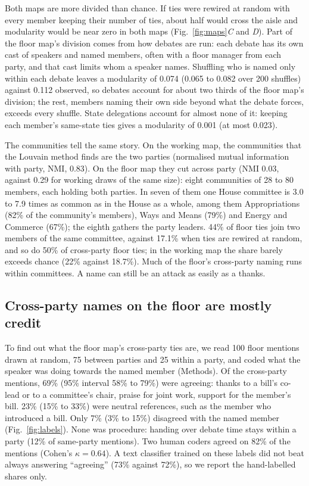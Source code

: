 \documentclass[9pt,twocolumn,twoside]{pnas-new}
\begin{document}
Both maps are more divided than chance. If ties were rewired at random with every member keeping their number of
ties, about half would cross the aisle and modularity would be near zero in both maps (Fig.~\ref{fig:maps}\emph{C}
and \emph{D}). Part of the floor map's division comes from how debates are run: each debate has its own cast of
speakers and named members, often with a floor manager from each party, and that cast limits whom a speaker names.
Shuffling who is named only within each debate leaves a modularity of 0.074 (0.065 to 0.082 over 200 shuffles)
against 0.112 observed, so debates account for about two thirds of the floor map's division; the rest, members
naming their own side beyond what the debate forces, exceeds every shuffle. State delegations account for almost
none of it: keeping each member's same-state ties gives a modularity of 0.001 (at most 0.023).

The communities tell the same story. On the working map, the communities that the Louvain method finds are the two
parties (normalised mutual information with party, NMI, 0.83). On the floor map they cut across party (NMI 0.03,
against 0.29 for working draws of the same size): eight communities of 28 to 80 members, each holding both parties.
In seven of them one House committee is 3.0 to 7.9 times as common as in the House as a whole, among them
Appropriations (82\% of the community's members), Ways and Means (79\%) and Energy and Commerce (67\%); the eighth
gathers the party leaders. 44\% of floor ties join two members of the same committee, against 17.1\% when ties are
rewired at random, and so do 50\% of cross-party floor ties; in the working map the share barely exceeds chance
(22\% against 18.7\%). Much of the floor's cross-party naming runs within committees. A name can still be an attack
as easily as a thanks.

\subsection*{Cross-party names on the floor are mostly credit}

To find out what the floor map's cross-party ties are, we read 100 floor mentions drawn at random, 75 between parties
and 25 within a party, and coded what the speaker was doing towards the named member (Methods). Of the cross-party
mentions, 69\% (95\% interval 58\% to 79\%) were agreeing: thanks to a bill's co-lead or to a committee's chair,
praise for joint work, support for the member's bill. 23\% (15\% to 33\%) were neutral references, such as the member
who introduced a bill. Only 7\% (3\% to 15\%) disagreed with the named member (Fig.~\ref{fig:labels}). None was
procedure: handing over debate time stays within a party (12\% of same-party mentions). Two human coders agreed on
82\% of the mentions (Cohen's $\kappa = 0.64$). A text classifier trained on these labels did not beat always
answering ``agreeing'' (73\% against 72\%), so we report the hand-labelled shares only.
\end{document}
